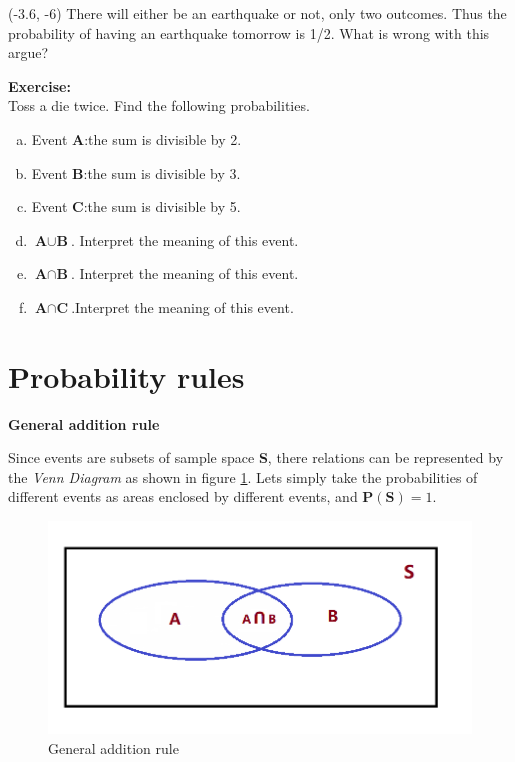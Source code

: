 \documentclass[a4paper, 12pt,twoside]{book}
\begin{document}
\begin{textblock}{3.3}(-3.6, -6)
\noindent
There will either be an earthquake or not, only two outcomes. Thus the probability of having an earthquake tomorrow is 1/2. What is wrong with this argue?\\
\end{textblock}
\hspace{-0.5cm}
\colorbox{champagne}{\parbox{\textwidth}{
    \textbf{Exercise:}\\
    Toss a die twice. Find the following probabilities.
    \begin{enumerate}[(a)]
        \item Event \textbf{A}:the sum is divisible by 2.
        \item Event \textbf{B}:the sum is divisible by 3.
        \item Event \textbf{C}:the sum is divisible by 5.
        \item $\textbf{A} \cup \textbf{B}$. Interpret the meaning of this event.
        \item $\textbf{A} \cap \textbf{B}$. Interpret the meaning of this event.
        \item $\textbf{A} \cap \textbf{C}$.Interpret the meaning of this event.
    \end{enumerate}   
}}
\newpage

\section{\large{Probability rules}}
\textbf{General addition rule}
\vspace{0.3cm}

    Since events are subsets of sample space \textbf{S}, there relations can be represented by the \textit{Venn Diagram} as shown in figure \ref{GeneralAdditionRule}. Lets simply take the probabilities of different events as areas enclosed by different events, and $\textbf{P}(\textbf{S}) = 1$.
    \begin{figure}[H]
    \centering
    \includegraphics[scale=0.6]{GeneralAdditionRule}
    \caption{General addition rule}
    \label{GeneralAdditionRule}    
    \end{figure}
    
\end{document}
